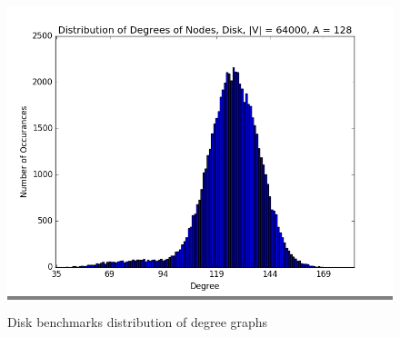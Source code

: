 \documentclass{article}
\begin{document}
\begin{figure}
\begin{minipage}{0.45\textwidth}
    \colorbox{gray}{\includegraphics[width=\linewidth]{./graphs/hist_deg_disk_2.png}}
    \end{minipage}

    \caption{Disk benchmarks distribution of degree graphs}
    \label{diskdeghists}
\end{figure}
\end{document}
